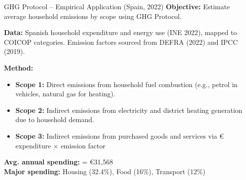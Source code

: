 \documentclass{beamer}
\begin{document}
\begin{frame}{GHG Protocol – Empirical Application (Spain, 2022)}
\vspace{-2.5em}
  \footnotesize
\textbf{Objective:} Estimate average household emissions by scope using GHG Protocol.

\vspace{0.6em}
\textbf{Data:}  
Spanish household expenditure and energy use (INE 2022), mapped to COICOP categories. Emission factors sourced from DEFRA (2022) and IPCC (2019).

\vspace{0.6em}
\textbf{Method:}
\begin{itemize}
  \item \textbf{Scope 1:} Direct emissions from household fuel combustion (e.g., petrol in vehicles, natural gas for heating).
  \item \textbf{Scope 2:} Indirect emissions from electricity and district heating generation due to household demand.
  \item \textbf{Scope 3:} Indirect emissions from purchased goods and services via € expenditure × emission factor
\end{itemize}

\vspace{0.6em}
\textbf{Avg. annual spending:} = €31,568 \\ 
\textbf{Major spending:} Housing (32.4\%), Food (16\%), Transport (12\%)
\end{frame}
\end{document}
